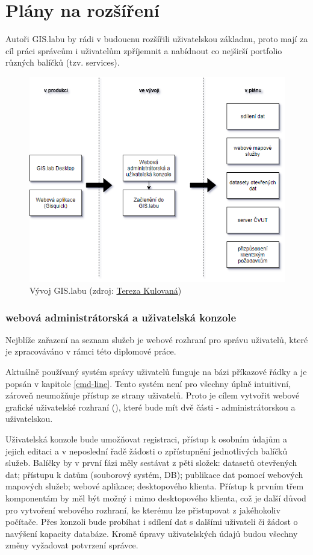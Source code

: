 \section{Plány na rozšíření}
\label{vision}

Autoři GIS.labu by rádi v budoucnu rozšířili uživatelskou základnu,
proto mají za cíl práci správcům i uživatelům zpříjemnit a nabídnout
co nejširší portfolio různých balíčků (tzv. services). 

\begin{figure}[H] \centering
    \includegraphics[width=350pt]{./pictures/gislab_road_map_02.png}
    \caption[Vývoj GIS.labu]{Vývoj GIS.labu (zdroj:
	\href{}{Tereza Kulovaná})}
    \label{fig:gislab-roadmap}
\end{figure}

\subsubsection{webová administrátorská a uživatelská konzole}

Nejblíže zařazení na seznam služeb je webové rozhraní pro správu
uživatelů, které je zpracováváno v rámci této diplomové
práce. 

Aktuálně používaný systém správy uživatelů funguje na bázi příkazové
řádky a je popsán v kapitole \ref{cmd-line}. Tento systém není pro
všechny úplně intuitivní, zároveň neumožňuje přístup ze strany
uživatelů. Proto je cílem vytvořit webové grafické uživatelské
rozhraní (), které bude mít dvě části - administrátorskou a
uživatelskou.

Uživatelská konzole bude umožňovat registraci, přístup k osobním
údajům a jejich editaci a v neposlední řadě žádosti o zpřístupnění
jednotlivých balíčků služeb. Balíčky by v první fázi měly sestávat z
pěti složek: datasetů otevřených dat; přístupu k datům (souborový
systém, DB); publikace dat pomocí webových mapových služeb; webové
aplikace; desktopového klienta. Přístup k prvním třem komponentám by
měl být možný i mimo desktopového klienta, což je další důvod pro
vytvoření webového rozhraní, ke kterému lze přistupovat z jakéhokoliv
počítače. Přes konzoli bude probíhat i sdílení dat s dalšími uživateli
či žádost o navýšení kapacity databáze. Kromě úpravy uživatelských
údajů budou všechny změny vyžadovat potvrzení správce.

